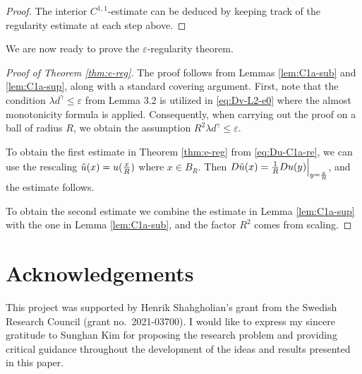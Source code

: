 \documentclass[11pt]{amsart}
\newcommand{\e}{\varepsilon}
\theoremstyle{plain}
\theoremstyle{definition}
\theoremstyle{remark}
\numberwithin{equation}{section}
\begin{document}
\begin{proof}
    
    The interior $C^{1,1}$-estimate  can be deduced by keeping track of the regularity estimate at each step above. 
\end{proof}




We are now ready to prove the $\e$-regularity theorem.


\begin{proof}
    [Proof of Theorem \ref{thm:e-reg}]
    The proof follows from Lemmas \ref{lem:C1a-sub} and \ref{lem:C1a-sup}, along with a standard covering argument. 
    First, note that the condition $\lambda d^\gamma \leq \varepsilon$ from Lemma 3.2 is utilized in \eqref{eq:Dv-L2-e0} where the almost monotonicity formula is applied. Consequently, when carrying out the proof on a ball of radius $R$, we obtain the assumption $R^2 \lambda d^\gamma \leq \varepsilon$.
    
   
    
    To obtain the first estimate in Theorem \ref{thm:e-reg} from \eqref{eq:Du-C1a-re}, we can use the rescaling $\Tilde{u} (x) = u (\frac{x}{R})$ where $x \in B_R$. Then $D \Tilde{u} (x) = \frac{1}{R} Du (y) \Big |_{y = \frac{x}{R}}$, and the estimate follows.

To obtain the second estimate we combine the estimate in Lemma \ref{lem:C1a-sup} with the one in Lemma \ref{lem:C1a-sub}, and the factor $R^2$ comes from scaling.

    
\end{proof}





\section*{Acknowledgements}
This project was     supported by  Henrik Shahgholian’s grant from  the Swedish Research Council (grant no.~2021-03700). I would like to express my sincere gratitude to Sunghan Kim for proposing the research problem and providing critical guidance throughout the development of the ideas and results presented in this paper.


\end{document}
